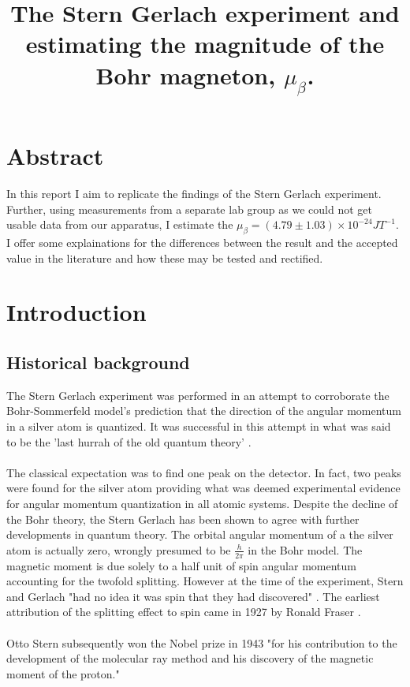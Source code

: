 \documentclass{article}%
\title{The Stern Gerlach experiment and estimating the magnitude of the Bohr magneton, $\mu_\beta$.}%
\date{}%
\begin{document}
%
\maketitle
\section*{Abstract}
In this report I aim to replicate the findings of the Stern Gerlach experiment. Further, using 
measurements from a separate lab group as we could not get usable data from our apparatus,
I estimate the $\mu_{\beta} = (4.79 \pm 1.03) \times 10^{-24} JT^{-1}$. I offer some explainations for the differences
between the result and the accepted value in the literature and how these may be tested and rectified.
\section{Introduction}
\subsection{Historical background}
The Stern Gerlach experiment \cite{SG} was performed in an attempt to corroborate the Bohr-Sommerfeld model's prediction that the direction of the angular momentum in a silver atom is quantized.
It was successful in this attempt in what was said to be the 'last hurrah of the old quantum theory' \cite{Baggot}. 
\paragraph{}
The classical expectation was to find one peak on the detector. In fact, two peaks were found for the silver atom providing what was deemed experimental evidence for angular momentum quantization in all atomic systems.
Despite the decline of the Bohr theory, the Stern Gerlach has been shown to agree with further developments in quantum theory. 
The orbital angular momentum of a the silver atom is actually zero, wrongly presumed to be $\frac{h}{2\pi}$ in the Bohr model. The magnetic moment is due solely to a half unit of spin angular momentum accounting for the twofold splitting.
However at the time of the experiment, Stern and Gerlach "had no idea it was spin that they had discovered" \cite{PT}. The earliest attribution of the splitting effect to spin came in 1927 by Ronald Fraser \cite{Fraser}. 
\paragraph{}
Otto Stern subsequently won the Nobel prize in 1943 "for his contribution to the development of the molecular ray method and his discovery of the magnetic moment of the proton." \cite{Nobel}
\end{document}
